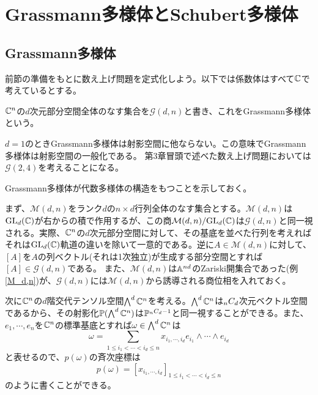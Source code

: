 \documentclass{ltjsreport}
\begin{document}
\section{Grassmann多様体とSchubert多様体}
\subsection{Grassmann多様体}

前節の準備をもとに数え上げ問題を定式化しよう。以下では係数体はすべて$\mathbb{C}$で考えているとする。

\begin{defin}
  $\mathbb{C}^{n}$の$d$次元部分空間全体のなす集合を$\mathcal{G}(d,n)$と書き、これをGrassmann多様体という。
\end{defin}

$d=1$のときGrassmann多様体は射影空間に他ならない。この意味でGrassmann多様体は射影空間の一般化である。
第3章冒頭で述べた数え上げ問題においては$\mathcal{G}(2,4)$を考えることになる。


Grassmann多様体が代数多様体の構造をもつことを示しておく。


まず、$\mathcal{M}(d,n)$をランク$d$の$n\times d$行列全体のなす集合とする。$\mathcal{M}(d,n)$は$\text{GL}_d(\mathbb{C})$が右からの積で作用するが、この商$\mathcal{M}(d,n)/\text{GL}_d(\mathbb{C})$は$\mathcal{G}(d,n)$と同一視される。実際、$\mathbb{C}^n$の$d$次元部分空間に対して、その基底を並べた行列を考えればそれは$\text{GL}_d(\mathbb{C})$軌道の違いを除いて一意的である。逆に$A\in\mathcal{M}(d,n)$に対して、$[A]$を$A$の列ベクトル(それは1次独立)が生成する部分空間とすれば$[A]\in\mathcal{G}(d,n)$である。
また、$\mathcal{M}(d,n)$は$\mathbb{A}^{nd}$のZariski開集合であった(例\ref{M_d,n})が、$\mathcal{G}(d,n)$には$\mathcal{M}(d,n)$から誘導される商位相を入れておく。


次に$\mathbb{C}^n$の$d$階交代テンソル空間$\bigwedge^d\mathbb{C}^n$を考える。$\bigwedge^d\mathbb{C}^n$は$_{n}C_{d}$次元ベクトル空間であるから、その射影化$\mathbb{P}(\bigwedge^d\mathbb{C}^n)$は$\mathbb{P}^{_{n}C_{d}-1}$と同一視することができる。また、$e_1,\cdots,e_n$を$\mathbb{C}^n$の標準基底とすれば$\omega\in\bigwedge^d\mathbb{C}^n$は
\[
\omega=\sum_{1\leq i_1<\cdots <i_d\leq n}x_{i_1,\cdots, i_d}e_{i_1}\wedge\cdots\wedge e_{i_d}  
\]
と表せるので、$p(\omega)$の斉次座標は
\[
p(\omega)=[x_{i_1,\cdots,i_d}]_{1\leq i_1<\cdots<i_d\leq n}  
\]
のように書くことができる。
\end{document}
